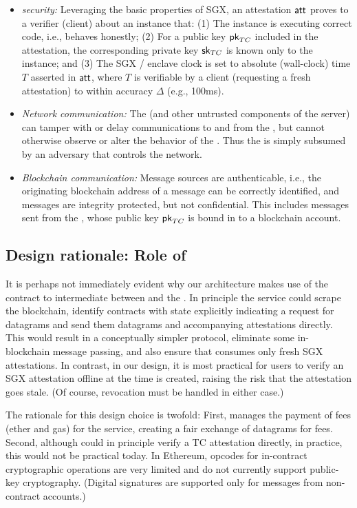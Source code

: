 \begin{itemize}
\item {\em \encname security:} Leveraging the basic properties of SGX, an attestation ${\sf att}$ proves to a verifier (client) about an \encname instance that: (1) The instance is executing correct code, i.e., behaves honestly; (2) For a public key ${\sf pk}_{TC}$ included in the attestation, the corresponding private key ${{\sf sk}_{TC}}$ is known only to the instance; and (3) The SGX / enclave clock is set to absolute (wall-clock) time $T$ asserted in ${\sf att}$, where $T$ is verifiable by a client (requesting a fresh attestation) to within accuracy $\Delta$ (e.g., 100ms).

\item {\em Network communication:} The \medname (and other untrusted components of the \tc server) can tamper with or delay communications to and from the \encname, but cannot otherwise observe or alter the behavior of the \encname. Thus the \medname is simply subsumed by an adversary that controls the network. 

\item {\em Blockchain communication:} Message sources are authenticable, i.e., the originating blockchain address of a message can be correctly identified, and messages are integrity protected, but not confidential. This includes messages sent from the \encname, whose public key ${\sf pk}_{TC}$ is bound in \tc to a blockchain account. 
\end{itemize}

\subsection{Design rationale: Role of \tcont}

It is perhaps not immediately evident why our architecture makes use of the contract \tcont to intermediate between \reqcont and the \encname. In principle the \tc service could scrape the blockchain, identify contracts with state explicitly indicating a request for datagrams and send them datagrams and accompanying attestations directly.  This would result in a conceptually simpler protocol, eliminate some in-blockchain message passing, and also ensure that \reqcont consumes only fresh SGX attestations. In contrast, in our design, it is most practical for users to verify an SGX attestation offline at the time \reqcont is created, raising the risk that the attestation goes stale. (Of course, revocation must be handled in either case.)

The rationale for this design choice is twofold: First, \tcont manages the payment of fees (ether and gas) for the \tc service, creating a fair exchange of datagrams for fees. Second, although \reqcont could in principle verify a TC attestation directly, in practice, this would not be practical today. In Ethereum, opcodes for in-contract cryptographic operations are very limited and do not currently support public-key cryptography. (Digital signatures are supported only for messages from non-contract accounts.) 



